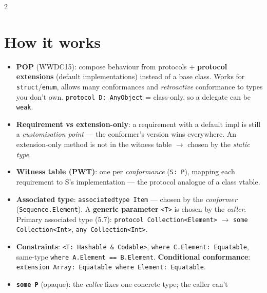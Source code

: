 \documentclass[8pt]{extarticle}
\begin{document}


\begin{multicols}{2}
\raggedright

\section{How it works}
\begin{itemize}
  \item \textbf{POP} (WWDC15): compose behaviour from protocols + \textbf{protocol extensions}
        (default implementations) instead of a base class. Works for \texttt{struct}/\texttt{enum},
        allows many conformances and \emph{retroactive} conformance to types you don't own.
        \texttt{protocol D: AnyObject} = class-only, so a delegate can be \texttt{weak}.
  \item \textbf{Requirement vs extension-only}: a requirement with a default impl is still a
        \emph{customisation point} — the conformer's version wins everywhere. An extension-only
        method is not in the witness table $\to$ chosen by the \emph{static type}.
  \item \textbf{Witness table (PWT)}: one per \emph{conformance} (\texttt{S: P}), mapping each
        requirement to S's implementation — the protocol analogue of a class vtable.
  \item \textbf{Associated type}: \texttt{associatedtype Item} — chosen by the \emph{conformer}
        (\texttt{Sequence.Element}). A \textbf{generic parameter} \texttt{<T>} is chosen by the
        \emph{caller}. Primary associated type (5.7): \texttt{protocol Collection<Element>} $\to$
        \texttt{some Collection<Int>}, \texttt{any Collection<Int>}.
  \item \textbf{Constraints}: \texttt{<T: Hashable \& Codable>}, \texttt{where C.Element: Equatable},
        same-type \texttt{where A.Element == B.Element}. \textbf{Conditional conformance}:
        \texttt{extension Array: Equatable where Element: Equatable}.
  \item \textbf{\texttt{some P}} (opaque): the \emph{callee} fixes one concrete type; the caller can't

\end{itemize}
\end{multicols}
\end{document}
